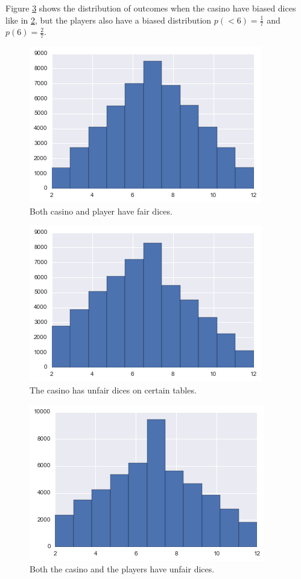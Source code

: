 \documentclass[12pt]{article}
\begin{document}
Figure \ref{casino_p_unfair} shows the distribution of outcomes when the casino have biased dices like in \ref{casino_c_unfair}, but the players also have a biased distribution $p(<6) = \frac{1}{7}$ and $p(6) = \frac{2}{7}$.

\begin{figure}
\includegraphics[]{casino_fair}
\centering
\caption{Both casino and player have fair dices.}
\label{casino_fair}
\end{figure}

\begin{figure}
\includegraphics[]{casino_c_unfair}
\centering
\caption{The casino has unfair dices on certain tables.}
\label{casino_c_unfair}
\end{figure}

\begin{figure}
\includegraphics[]{casino_p_unfair}
\centering
\caption{Both the casino and the players have unfair dices.}
\label{casino_p_unfair}
\end{figure}
 
\end{document}
